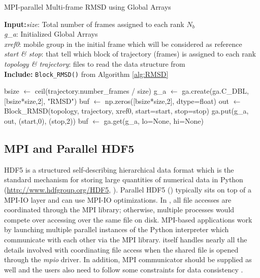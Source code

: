 \begin{algorithm}[ht!]
	\scriptsize
	\caption{MPI-parallel Multi-frame RMSD using Global Arrays}
	\label{alg:GA}
	\hspace*{\algorithmicindent} \textbf{Input:}\emph{size}: Total number of frames assigned to each rank $N_{b}$\\
	\hspace*{\algorithmicindent} \emph{g\_a}: Initialized Global Arrays \\
	\hspace*{\algorithmicindent} \emph{xref0}: mobile group in the initial frame which will be considered as reference \\
	\hspace*{\algorithmicindent} \emph{start \& stop}: that tell which block of trajectory (frames) is assigned to each rank \\
	\hspace*{\algorithmicindent} \emph{topology \& trajectory}: files to read the data structure from \\
	\hspace*{\algorithmicindent}\textbf{Include:} \texttt{Block\_RMSD()} from Algorithm \ref{alg:RMSD}
	\begin{algorithmic}[1]
		
		\State bsize $\leftarrow$ ceil(trajectory.number\_frames / size)
		\State g\_a $\leftarrow$ ga.create(ga.C\_DBL, [bsize*size,2], "RMSD")
		\State buf $\leftarrow$ np.zeros([bsize*size,2], dtype=float)
		\State out $\leftarrow$ Block\_RMSD(topology, trajectory, xref0, start=start, stop=stop)
		\State ga.put(g\_a, out, (start,0), (stop,2))
		\State buf $\leftarrow$ ga.get(g\_a, lo=None, hi=None)
		\EndIf
	\end{algorithmic}
\end{algorithm}

\subsection{MPI and Parallel HDF5}
HDF5 is a structured self-describing hierarchical data format which is the standard mechanism for storing large quantities of numerical data in Python (\url{http://www.hdfgroup.org/HDF5}, \cite{pythonhdf5}).
Parallel HDF5 () typically sits on top of a MPI-IO layer and can use MPI-IO optimizations. 
In , all file accesses are coordinated through the MPI library; otherwise, multiple processes would compete over accessing over the same file on disk. 
MPI-based applications work by launching multiple parallel instances of the Python interpreter which communicate with each other via the MPI library. 
 itself handles nearly all the details involved with coordinating file access when the shared file is opened through the \emph{mpio} driver.
In addition, MPI communicator should be supplied as well and the users also need to follow some constraints for data consistency \cite{pythonhdf5}.

